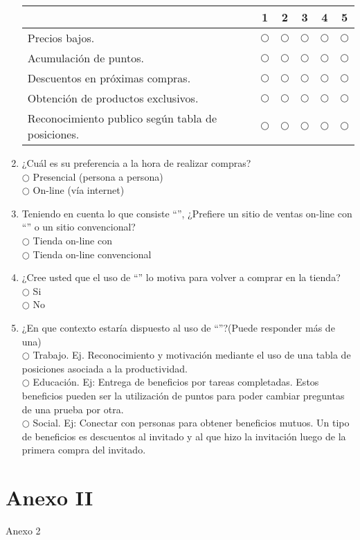 \begin{enumerate}
\begin{table}[h]
\centering
\begin{tabular}{|l|c|c|c|c|c|}
\hline
 & {\bf 1} & {\bf 2} & {\bf 3} & {\bf 4} & {\bf 5} \\
\hline
Precios bajos. & $\bigcirc$ & $\bigcirc$ & $\bigcirc$ & $\bigcirc$ & $\bigcirc$ \\
\hline
Acumulación de puntos. & $\bigcirc$ & $\bigcirc$ & $\bigcirc$ & $\bigcirc$ & $\bigcirc$ \\
\hline
Descuentos en próximas compras. & $\bigcirc$ & $\bigcirc$ & $\bigcirc$ & $\bigcirc$ & $\bigcirc$ \\
\hline
Obtención de productos exclusivos. & $\bigcirc$ & $\bigcirc$ & $\bigcirc$ & $\bigcirc$ & $\bigcirc$ \\
\hline
Reconocimiento publico según tabla de posiciones. & $\bigcirc$ & $\bigcirc$ & $\bigcirc$ & $\bigcirc$ & $\bigcirc$ \\
\hline
\end{tabular}
\end{table}

\item ¿Cuál es su preferencia a la hora de realizar compras? \\

$\bigcirc$ Presencial (persona a persona) \\
$\bigcirc$ On-line (vía internet)

\item Teniendo en cuenta lo que consiste ``{\gam}'', ¿Prefiere un sitio de ventas on-line con ``{\gam}'' o un sitio convencional? \\

$\bigcirc$ Tienda on-line con {\gam} \\
$\bigcirc$ Tienda on-line convencional

\item ¿Cree usted que el uso de ``{\gam}'' lo motiva para volver a comprar en la tienda? \\

$\bigcirc$ Si \\
$\bigcirc$ No

\item  ¿En que contexto estaría dispuesto al uso de ``{\gam}''?(Puede responder más de una)\\
 
$\bigcirc$ Trabajo. Ej. Reconocimiento y motivación mediante el uso de una tabla de posiciones asociada a la productividad. \\
$\bigcirc$ Educación. Ej: Entrega de beneficios por tareas completadas. Estos beneficios pueden ser la utilización de puntos para poder cambiar preguntas de una prueba por otra. \\
$\bigcirc$  Social. Ej: Conectar con personas para obtener beneficios mutuos. Un tipo de beneficios es descuentos al invitado y al que hizo la invitación luego de la primera compra del invitado.
\end{enumerate}

\section{Anexo II}

Anexo 2
